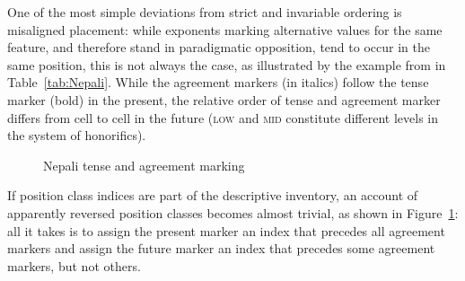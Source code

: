 \documentclass[output=paper
 	        ,biblatex
                ,babelshorthands
                ,newtxmath
                ,draftmode
                ,colorlinks, citecolor=brown
]{langscibook}
\begin{document}
\begin{exe}
\begin{xlist}
\begin{exe}
\begin{xlist}
One of the most simple deviations from strict and invariable ordering
is misaligned placement: while exponents marking alternative values
for the same feature, and therefore stand in paradigmatic opposition,
tend to occur in the same position, this is not always the case, as
illustrated by the example from  in Table~\ref{tab:Nepali}.  
While the agreement markers (in italics) follow the tense marker (bold) in the present,
the relative order of tense and agreement marker differs from cell to
cell in the future (\textsc{low} and \textsc{mid} constitute
different levels in the system of honorifics).

\begin{figure}[htb]
  \centering
    \caption{Nepali tense and agreement marking}\label{fig:AnalysisNepali}
\end{figure}

If position class indices are part of the descriptive inventory, an
account of apparently reversed position classes \citep{Stump93}
becomes almost trivial, as shown in Figure~\ref{fig:AnalysisNepali}:
all it takes is to assign the present marker an index that precedes
all agreement markers and assign the future marker an index that
precedes some agreement markers, but not others.


\end{xlist}
\end{exe}
\end{xlist}
\end{exe}
\end{document}
